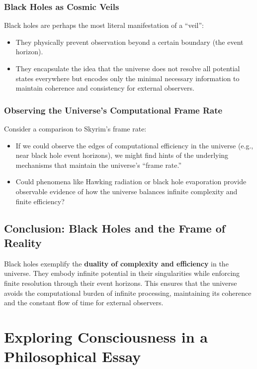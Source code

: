 \documentclass[12pt]{article}
\begin{document}
\subsubsection{Black Holes as Cosmic Veils}

Black holes are perhaps the most literal manifestation of a ``veil'':
\begin{itemize}
    \item They physically prevent observation beyond a certain boundary (the event horizon).
    \item They encapsulate the idea that the universe does not resolve all potential states everywhere but encodes only the minimal necessary information to maintain coherence and consistency for external observers.
\end{itemize}

\subsubsection{Observing the Universe’s Computational Frame Rate}

Consider a comparison to Skyrim's frame rate:
\begin{itemize}
    \item If we could observe the edges of computational efficiency in the universe (e.g., near black hole event horizons), we might find hints of the underlying mechanisms that maintain the universe's ``frame rate.''
    \item Could phenomena like Hawking radiation or black hole evaporation provide observable evidence of how the universe balances infinite complexity and finite efficiency?
\end{itemize}

\subsection{Conclusion: Black Holes and the Frame of Reality}

Black holes exemplify the \textbf{duality of complexity and efficiency} in the universe. They embody infinite potential in their singularities while enforcing finite resolution through their event horizons. This ensures that the universe avoids the computational burden of infinite processing, maintaining its coherence and the constant flow of time for external observers.


\section{Exploring Consciousness in a Philosophical Essay}
\end{document}
